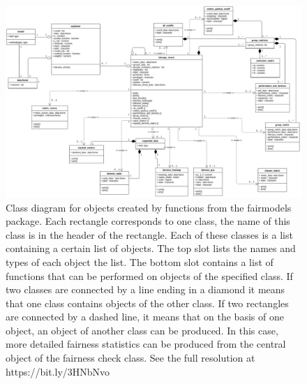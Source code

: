 \begin{figure}

{\centering \includegraphics[width=1\linewidth]{class_diagram} 

}

\caption[Class diagram for objects created by functions from the fairmodels package]{Class diagram for objects created by functions from the fairmodels package. Each rectangle corresponds to one class, the name of this class is in the header of the rectangle. Each of these classes is a list containing a certain list of objects. The top slot lists the names and types of each object the list. The bottom slot contains a list of functions that can be performed on objects of the specified class. If two classes are connected by a line ending in a diamond it means that one class contains objects of the other class. If two rectangles are connected by a dashed line, it means that on the basis of one object, an object of another class can be produced. In this case, more detailed fairness statistics can be produced from the central object of the fairness check class. See the full resolution at https://bit.ly/3HNbNvo}\label{fig:classdiagram}
\end{figure}

